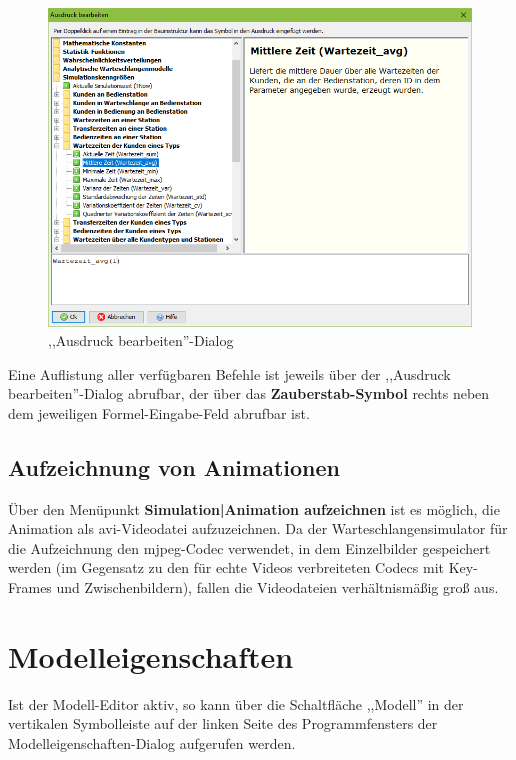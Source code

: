 \documentclass[deutsch]{svmono}
\begin{document}
\begin{figure}[H]	
	\caption{,,Ausdruck bearbeiten''-Dialog}
	\centerline{\includegraphics[width=14cm]{DialogExpressionBuilder.png}}
	\label{fig:DialogExpressionBuilder}
\end{figure} 

Eine Auflistung aller verfügbaren Befehle ist jeweils über der ,,Ausdruck bearbeiten''-Dialog abrufbar, der über das \textbf{Zauberstab-Symbol} rechts neben dem jeweiligen Formel-Eingabe-Feld abrufbar ist.

\section{Aufzeichnung von Animationen}

Über den Menüpunkt \textbf{Simulation|Animation aufzeichnen} ist es möglich, die Animation als avi-Videodatei aufzuzeichnen. Da der Warteschlangensimulator für die Aufzeichnung den mjpeg-Codec verwendet, in dem Einzelbilder gespeichert werden (im Gegensatz zu den für echte Videos verbreiteten Codecs mit Key-Frames und Zwischenbildern), fallen die Videodateien verhältnismäßig groß aus.



\chapter{Modelleigenschaften}

Ist der Modell-Editor aktiv, so kann über die Schaltfläche ,,Modell'' in der vertikalen Symbolleiste auf der linken Seite des Programmfensters der Modelleigenschaften-Dialog aufgerufen werden.
 
\end{document}

